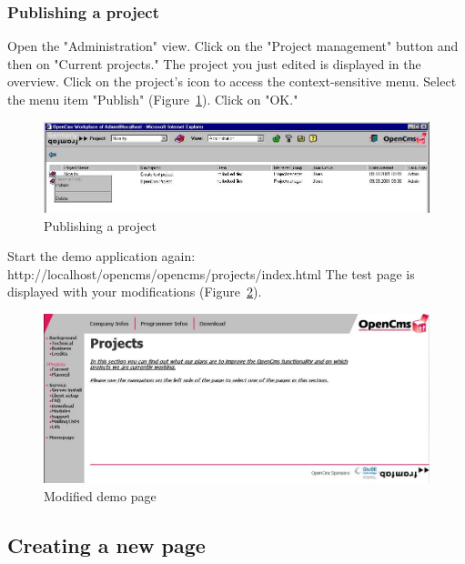 \subsubsection{Publishing a project}

Open the "Administration" view. Click on the "Project management"
button and then on "Current projects." The project you just edited
is displayed in the overview. Click on the project's icon to
access the context-sensitive menu. Select the menu item "Publish"
(Figure~\ref{publishproject}). Click on "OK."

\begin{figure}[hbt]
\begin{center}
\includegraphics[width=\sgw]
                   {pics/usermanual/publishProject01}
\caption[Publishing a project]
           {Publishing a project}
\label{publishproject}
\end{center}
\end{figure}

Start the demo application again:
http://localhost/opencms/opencms/projects/index.html The test page
is displayed with your modifications (Figure~\ref{demopage02}).

\begin{figure}[hbt]
\begin{center}
\includegraphics[width=\sgw]
                   {pics/usermanual/demoPage02}
\caption[Modified demo page]
           {Modified demo page}
\label{demopage02}
\end{center}
\end{figure}


\subsection{Creating a new page}

